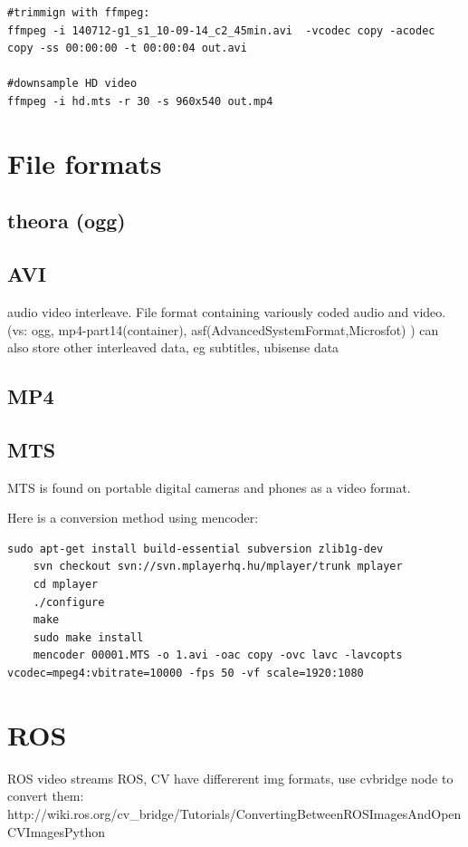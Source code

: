 \documentclass[oneside,english]{scrbook}
\begin{document}
\begin{lstlisting}
#trimmign with ffmpeg:
ffmpeg -i 140712-g1_s1_10-09-14_c2_45min.avi  -vcodec copy -acodec copy -ss 00:00:00 -t 00:00:04 out.avi

#downsample HD video
ffmpeg -i hd.mts -r 30 -s 960x540 out.mp4
\end{lstlisting}

\chapter{File formats}


\section{theora (ogg)}

\section{AVI}
audio video interleave.  File format containing variously coded audio and video.
	(vs: ogg, mp4-part14(container), asf(AdvancedSystemFormat,Microsfot) )
	can also store other interleaved data, eg subtitles, ubisense data

\section{MP4}

\section{MTS}
MTS is found on portable digital cameras and phones as a video format.  

Here is a conversion method using mencoder:

\begin{lstlisting}
sudo apt-get install build-essential subversion zlib1g-dev
	svn checkout svn://svn.mplayerhq.hu/mplayer/trunk mplayer
	cd mplayer
	./configure
	make
	sudo make install
	mencoder 00001.MTS -o 1.avi -oac copy -ovc lavc -lavcopts vcodec=mpeg4:vbitrate=10000 -fps 50 -vf scale=1920:1080
\end{lstlisting}

\chapter{ROS}

ROS video streams ROS, CV have differerent img formats, use cvbridge
node to convert them: http://wiki.ros.org/cv\_bridge/Tutorials/ConvertingBetweenROSImagesAndOpenCVImagesPython
\end{document}
